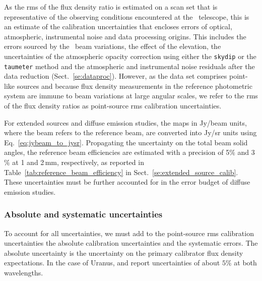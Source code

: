 {\lp As the rms of the flux density ratio is estimated on a scan set
that is representative of the observing conditions encountered at
the \trentemetre\ telescope, this is an estimate of the
calibration uncertainties that encloses errors of
optical, atmospheric, instrumental noise and data processing
origins. This includes the errors sourced by the \afternoon\ beam 
variations, the effect of the elevation, the uncertainties of the
atmospheric opacity correction using either the {\tt skydip} or
the {\tt taumeter} method and the atmospheric and instrumental noise
residuals after the data reduction (Sect.~\ref{se:dataproc}). {\rev
However, as the data set comprises point-like sources and because flux
density measurements in the reference photometric system are immune to
beam variations at large angular scales, we refer to the rms of the
flux density ratios as point-source rms calibration uncertainties.}

{\rev For extended sources and diffuse emission studies, the maps in
Jy/beam units, where the beam refers to the reference beam, are
converted into Jy/sr units using
Eq.~\ref{eq:jybeam_to_jysr}. Propagating the uncertainty on the
total beam solid angles, the reference beam efficiencies are estimated
with a precision of 5$\%$ and 3$\%$ at 1 and 2\,mm,
respectively, as reported in Table~\ref{tab:reference_beam_efficiency}
in Sect.~\ref{se:extended_source_calib}. These uncertainties must be
further accounted for in the error budget of diffuse emission studies.}


\subsubsection{Absolute and systematic uncertainties}
\label{se:def_systematic_errors}

To account for all uncertainties, we must add to the {\rev
point-source} rms calibration uncertainties the absolute calibration
uncertainties and the systematic errors. The absolute uncertainty is
the uncertainty on the primary calibrator flux density expectations. 
In the case of Uranus, \citet{Morenothesis} and \citet{Bendo2013} report 
uncertainties of about $5\%$ at both wavelengths.

}
